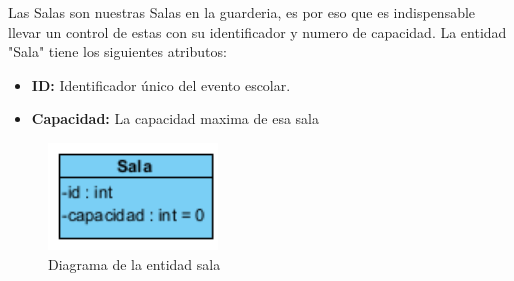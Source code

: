 Las Salas son nuestras Salas en la guarderia, es por eso que es indispensable llevar un control de estas con su identificador y numero de capacidad.
La entidad "Sala" tiene los siguientes atributos:

\begin{itemize}
\item \textbf{ID:} Identificador único del evento escolar.
\item \textbf{Capacidad:} La capacidad maxima de esa sala
\end{itemize}


\begin{figure}[htbp]
\centering
\includegraphics[width=0.4\textwidth]{images/arqui/sala.png}
\caption{Diagrama de la entidad sala}
\label{fig:colecSala}
\end{figure}
\clearpage